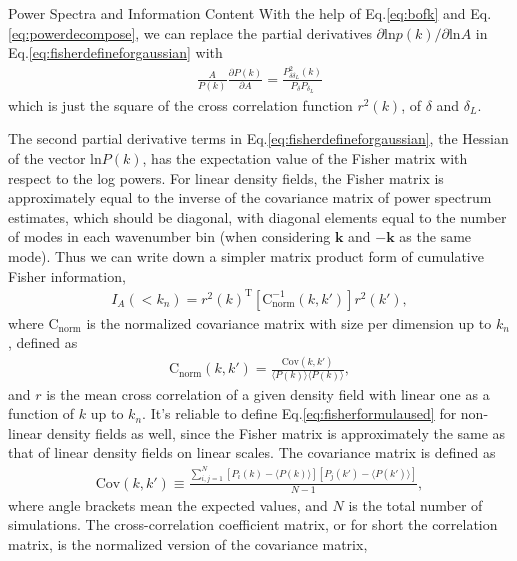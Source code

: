 \begin{section}{Power Spectra and Information Content}
   With the help of Eq.\ref{eq:bofk} and Eq.\ref{eq:powerdecompose}, we can replace the partial derivatives 
$\partial \mathrm{ln} p(k) / \partial \mathrm{ln} A$ in Eq.\ref{eq:fisherdefineforgaussian} with 
\begin{align}
   \frac{A}{P(k)}\frac{\partial P(k)}{\partial A}=\frac{P_{\delta \delta_L}^2(k)}{P_\delta P_{\delta_L}}
\end{align}
which is just the square of the 
cross correlation function $r ^2 (k)$, of $\delta$ and $\delta_L$. 

The second partial derivative terms in 
Eq.\ref{eq:fisherdefineforgaussian}, the Hessian of the vector $\mathrm{ln} P(k)$, has the expectation 
value of the Fisher matrix with respect to the log powers. For linear density fields, the Fisher matrix is 
approximately equal to the inverse of the covariance matrix of power spectrum estimates, which should be diagonal, 
with diagonal elements equal to the number of modes in each wavenumber bin (when considering $\bm{k}$ and $-\bm{k}$ 
as the same mode). Thus we can write down a simpler matrix product form of cumulative Fisher information, 
\begin{align}
    I_A \left( < k_n\right) = r^2(k)^{\mathrm{T}} \left[ \mathrm{C^{-1}_{norm}} ( k,k' )\right] r^2(k') ,
\label{eq:fisherformulaused}
\end{align}
where $\mathrm{C_{norm}}$ is the normalized covariance matrix with size per dimension up to $k_n$, defined as
\begin{align}
    \mathrm{C_{norm}} \left( k,k' \right)=\frac{\mathrm{Cov}(k,k')}{\langle P(k)\rangle\langle P(k)\rangle},
\end{align}
and $r$ is the mean cross correlation of a given density field with linear one as a function of $k$ up to $k_n$. 
It's reliable to define Eq.\ref{eq:fisherformulaused} for non-linear density fields as well, 
since the Fisher matrix is approximately the same as that of linear density fields on linear scales. 
The covariance matrix is defined as 
\begin{align}
    \mathrm{Cov}\left(k,k'\right)\equiv \frac{\sum_{i,j=1}^{N}\left[ P_i \left( k \right) - 
\langle P \left( k \right) \rangle \right]\left[ P_j \left( k' \right) - \langle P \left( k' \right)\rangle \right]}{N-1},
\end{align}
where angle brackets mean the expected values, and $N$ is the total number of simulations.
    The  cross-correlation coefficient matrix, or for short the correlation matrix, is the normalized version of the covariance matrix,

\end{section}

